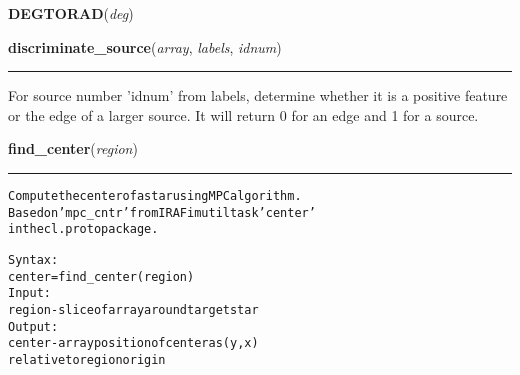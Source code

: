     \label{multireg:findobjects:DEGTORAD}
    \vspace{0.5ex}

    \begin{boxedminipage}{\textwidth}

    \raggedright \textbf{DEGTORAD}(\textit{deg})

    \end{boxedminipage}

    \label{multireg:findobjects:discriminate_source}
    \vspace{0.5ex}

    \begin{boxedminipage}{\textwidth}

    \raggedright \textbf{discriminate\_source}(\textit{array}, \textit{labels}, \textit{idnum})

    \vspace{-1.5ex}

    \rule{\textwidth}{0.5\fboxrule}
    For source number 'idnum' from labels, determine whether it is a 
    positive feature or the edge of a larger source. It will return 0 for 
    an edge and 1 for a source.

    \vspace{1ex}

    \end{boxedminipage}

    \label{multireg:findobjects:find_center}
    \vspace{0.5ex}

    \begin{boxedminipage}{\textwidth}

    \raggedright \textbf{find\_center}(\textit{region})

    \vspace{-1.5ex}

    \rule{\textwidth}{0.5\fboxrule}
\begin{alltt}
Compute the center of a star using MPC algorithm. 
Based on 'mpc\_cntr' from IRAF imutil task 'center'
in the cl.proto package.

Syntax:
    center = find\_center(region)
Input:
    region - slice of array around target star
Output: 
    center - array position of center as (y,x)
                relative to region origin\end{alltt}

    \vspace{1ex}

    \end{boxedminipage}

